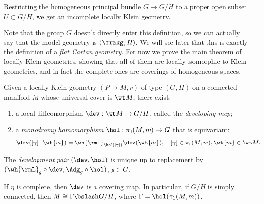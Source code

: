 \begin{example}
    Restricting the homogeneous principal bundle $G\to G\slash H$ to a proper open subset $U\subset G\slash H$, we get an incomplete locally Klein geometry.
\end{example}

Note that the group $G$ doesn't directly enter this definition, so we can actually say that the model geometry is $(\frakg,H)$. We will see later that this is exactly the definition of a \emph{flat Cartan geometry}. For now we prove the main theorem of locally Klein geometries, showing that all of them are locally isomorphic to Klein geometries, and in fact the complete ones are coverings of homogeneous spaces.

\begin{thm}\label{prop locally klein}
    Given a locally Klein geometry $(P\to M,\eta)$ of type $(G,H)$ on a connected manifold $M$ whose universal cover is $\wt M$, there exist:
    \begin{enumerate}
        \item a local diffeomorphism $\dev: \wt M\to G\slash H$, called the \emph{developing map};
        \item a \emph{monodromy homomorphism} $\hol:\pi_1(M,m)\to G$ that is equivariant: 
        \[\dev([\gamma]\cdot \wt{m})=\wh{\rmL}_{\hol([\gamma])}\dev(\wt{m}),\quad [\gamma]\in \pi_1(M,m),\wt{m}\in\wt M.\]
    \end{enumerate} 
    The \emph{development pair} $(\dev,\hol)$ is unique up to replacement by $(\wh{\rmL}_g\circ \dev,\Adg_g\circ\hol)$, $g\in G$.

    If $\eta$ is complete, then $\dev$ is a covering map. In particular, if $G\slash H$ is simply connected, then $M\cong \Gamma\bslash G\slash H$, where $\Gamma=\hol(\pi_1(M,m))$.
\end{thm}
